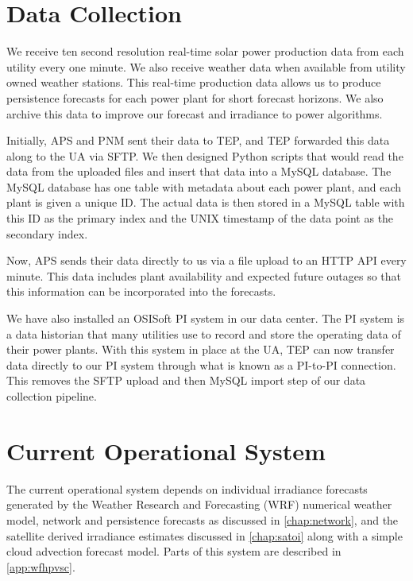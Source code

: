 \section{Data Collection}
\label{sec:datacollection}

We receive ten second resolution real-time solar power production data
from each utility every one minute.
We also receive weather data when available from utility owned weather
stations.
This real-time production data allows us to produce persistence
forecasts for each power plant for short forecast horizons.
We also archive this data to improve our forecast and irradiance to
power algorithms.

Initially, APS and PNM sent their data to TEP, and TEP forwarded this
data along to the UA via SFTP.
We then designed Python scripts that would read the data from the
uploaded files and insert that data into a MySQL database.
The MySQL database has one table with metadata about each power plant,
and each plant is given a unique ID.
The actual data is then stored in a MySQL table with this ID as the
primary index and the UNIX timestamp of the data point as the secondary
index.

Now, APS sends their data directly to us via a file upload to an HTTP
API every minute.
This data includes plant availability and expected future outages so
that this information can be incorporated into the forecasts.

We have also installed an OSISoft PI system in our data center.
The PI system is a data historian that many utilities use to record
and store the operating data of their power plants.
With this system in place at the UA, TEP can now transfer data
directly to our PI system through what is known as a PI-to-PI
connection.
This removes the SFTP upload and then MySQL import step of our data
collection pipeline.

\section{Current Operational System}
\label{sec:opsys}

The current operational system depends on individual irradiance forecasts
generated by the Weather Research and Forecasting (WRF) numerical
weather model, network and persistence forecasts as discussed in
\cref{chap:network}, and the satellite derived irradiance estimates
discussed in \cref{chap:satoi} along with a simple cloud advection
forecast model.
Parts of this system are described in \cref{app:wfhpvsc}.

